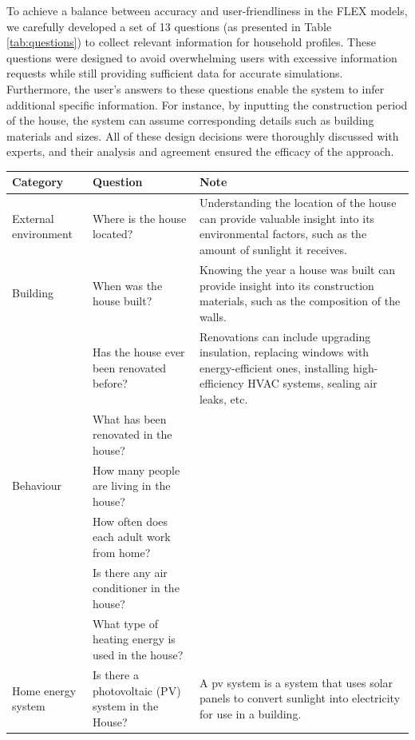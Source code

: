 To achieve a balance between accuracy and user-friendliness in the FLEX models, we carefully developed a set of 13 questions (as presented in Table \ref{tab:questions}) to collect relevant information for household profiles. 
These questions were designed to avoid overwhelming users with excessive information requests while still providing sufficient data for accurate simulations.
Furthermore, the user's answers to these questions enable the system to infer additional specific information. 
For instance, by inputting the construction period of the house, the system can assume corresponding details such as building materials and sizes.
All of these design decisions were thoroughly discussed with experts, and their analysis and agreement ensured the efficacy of the approach.

\begin{center}
  \scriptsize
    \begin{longtable}{ | p{} | p{} | p{} | }
        \hline
        \textbf{Category} & \textbf{Question} & \textbf{Note} \\
        \hline
        External environment & Where is the house located? & Understanding the location of the house can provide valuable insight into its environmental factors, such as the amount of sunlight it receives. \\
        \hline
        Building & When was the house built? & Knowing the year a house was built can provide insight into its construction materials, such as the composition of the walls. \\
          & Has the house ever been renovated before? & Renovations can include upgrading insulation, replacing windows with energy-efficient ones, installing high-efficiency HVAC systems, sealing air leaks, etc. \\
          & What has been renovated in the house? &   \\
        \hline
        Behaviour & How many people are living in the house? &   \\
          & How often does each adult work from home? &   \\
          & Is there any air conditioner in the house? &   \\
          & What type of heating energy is used in the house? &   \\
        \hline
        Home energy system  & Is there a photovoltaic (PV) system in the House? & A \gls{pv} system is a system that uses solar panels to convert sunlight into electricity for use in a building. \\    

\end{longtable}
\end{center}
